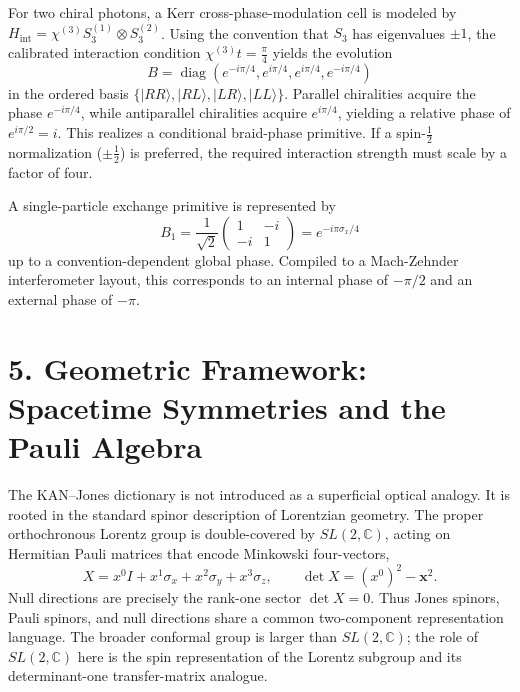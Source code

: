 \documentclass[aps,prl,twocolumn,superscriptaddress,amsmath,amssymb]{revtex4-2}
\begin{document}
For two chiral photons, a Kerr cross-phase-modulation cell is modeled by $H_{\mathrm{int}}=\chi^{(3)}S_3^{(1)}\otimes S_3^{(2)}$. Using the convention that $S_3$ has eigenvalues $\pm1$, the calibrated interaction condition $\chi^{(3)}t=\frac{\pi}{4}$ yields the evolution
\begin{equation}
B=\operatorname{diag}\left(e^{-i\pi/4}, e^{i\pi/4}, e^{i\pi/4}, e^{-i\pi/4}\right)
\end{equation}
in the ordered basis $\{|RR\rangle, |RL\rangle, |LR\rangle, |LL\rangle\}$. Parallel chiralities acquire the phase $e^{-i\pi/4}$, while antiparallel chiralities acquire $e^{i\pi/4}$, yielding a relative phase of $e^{i\pi/2}=i$. This realizes a conditional braid-phase primitive. If a spin-$\frac{1}{2}$ normalization ($\pm\frac{1}{2}$) is preferred, the required interaction strength must scale by a factor of four.

A single-particle exchange primitive is represented by
\begin{equation}
B_1=\frac{1}{\sqrt{2}}
\begin{pmatrix}
1 & -i\\
-i & 1
\end{pmatrix}
= e^{-i\pi\sigma_x/4}
\end{equation}
up to a convention-dependent global phase. Compiled to a Mach-Zehnder interferometer layout, this corresponds to an internal phase of $-\pi/2$ and an external phase of $-\pi$.

\section{5. Geometric Framework: Spacetime Symmetries and the Pauli Algebra}

The KAN--Jones dictionary is not introduced as a superficial optical analogy. It is rooted in the standard spinor description of Lorentzian geometry. The proper orthochronous Lorentz group is double-covered by $SL(2,\mathbb{C})$, acting on Hermitian Pauli matrices that encode Minkowski four-vectors,
\begin{equation}
X=x^0 I+x^1\sigma_x+x^2\sigma_y+x^3\sigma_z,
\qquad
\det X=(x^0)^2-\mathbf{x}^2.
\end{equation}
Null directions are precisely the rank-one sector $\det X=0$. Thus Jones spinors, Pauli spinors, and null directions share a common two-component representation language. The broader conformal group is larger than $SL(2,\mathbb{C})$; the role of $SL(2,\mathbb{C})$ here is the spin representation of the Lorentz subgroup and its determinant-one transfer-matrix analogue.
\end{document}
